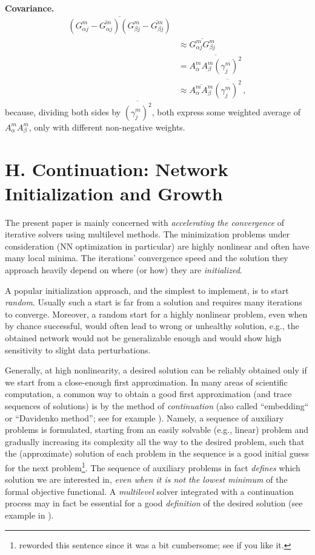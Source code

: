 \documentclass{article} %
\begin{document}
{\bf Covariance.}
\begin{equation}
    \begin{split}
    \overline{\left(G^m_{\alpha j} - \overline{G^m_{\alpha j}}\right) \left(G^m_{\beta j} - \overline{G^m_{\beta j}}\right)} & \\
     & \approx \overline{G^m_{\alpha j} G^m_{\beta j}} \\
     & = \overline{A^m_{\alpha} A^m_{\beta} \left(\gamma^m_j\right)^2} \\
     & \approx \overline{A^m_{\alpha} A^m_{\beta}} \overline{\left(\gamma^m_j\right)^2}\,,
    \end{split}
    \label{g_cov}
\end{equation}
because, dividing both sides by $\overline{\left(\gamma^m_j\right)^2}$, both express some weighted average of $A^m_{\alpha} A^m_{\beta}$, only with different non-negative weights.

\section{H. Continuation: Network Initialization and Growth}
\label{sec:h}
The present paper is mainly concerned with {\it accelerating the convergence} of iterative solvers using multilevel methods. The minimization problems under consideration (NN optimization in particular) are highly nonlinear and often have many local minima. The iterations' convergence speed and the solution they approach heavily depend on where (or how) they are {\it initialized}.

A popular initialization approach, and the simplest to implement, is to start {\it random}. Usually such a start is far from a solution and requires many iterations to converge. Moreover, a random start for a highly nonlinear problem, even when by chance successful, would often lead to wrong or unhealthy solution, e.g., the obtained network would not be generalizable enough and would show high sensitivity to slight data perturbations.

Generally, at high nonlinearity, a desired solution can be reliably obtained only if we start from a close-enough first approximation. In many areas of scientific computation, a common way to obtain a good first approximation (and trace sequences of solutions) is by the method of {\it continuation} (also called ``embedding`` or ``Davidenko method''; see for example \cite{keller77}). Namely, a sequence of auxiliary problems is formulated, starting from an easily solvable (e.g., linear) problem and gradually increasing its complexity all the way to the desired problem, such that the (approximate) solution of each problem in the sequence is a good initial guess for the next problem\footnote{reworded this sentence since it was a bit cumbersome; see if you like it.}. The sequence of auxiliary problems in fact {\it defines} which solution we are interested in, {\it even when it is not the lowest minimum} of the formal objective functional. A {\it multilevel} solver integrated with a continuation process may in fact be essential for a good {\it definition} of the desired solution (see example in \cite{SafRon}).
\end{document}
